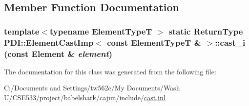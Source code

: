 \subsection{Member Function Documentation}
\hypertarget{class_p_d_i_1_1_element_cast_imp_3_01const_01_element_type_t_01_6_01_4_f98f6a39c5f6b3f1d49030db55e57427}{
\subsubsection[{cast\_\-i}]{\setlength{\rightskip}{0pt plus 5cm}template$<$typename ElementTypeT $>$ static {\bf ReturnType} PDI::ElementCastImp$<$ const ElementTypeT \& $>$::cast\_\-i (const {\bf Element} \& {\em element})}}
\label{class_p_d_i_1_1_element_cast_imp_3_01const_01_element_type_t_01_6_01_4_f98f6a39c5f6b3f1d49030db55e57427}




The documentation for this class was generated from the following file:\begin{CompactItemize}
\item 
C:/Documents and Settings/tw562c/My Documents/Wash U/CSE533/project/babelshark/cajun/include/\hyperlink{cast_8inl}{cast.inl}\end{CompactItemize}
